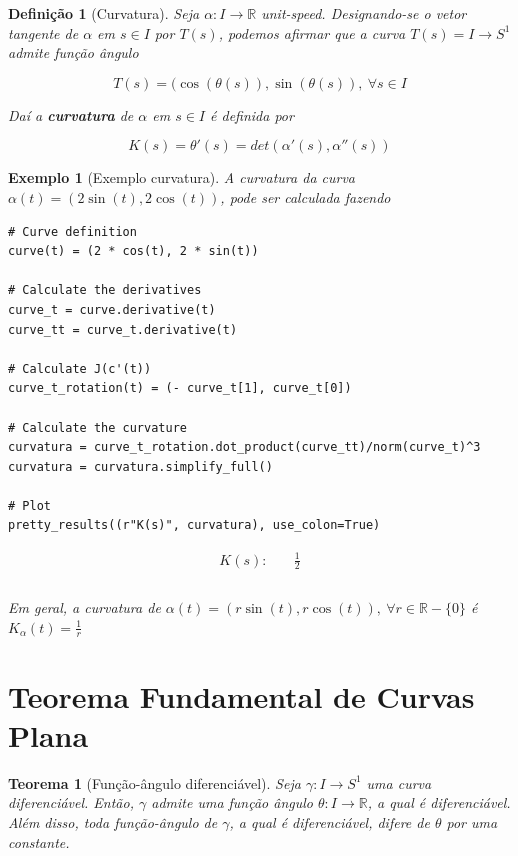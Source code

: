 \documentclass[12pt]{article}
\newtheorem{ex}{Exemplo}[section]
\newtheorem{theorem}{Teorema}
\newtheorem{definition}{Definição}
\begin{document}
\begin{definition}[Curvatura]
Seja $\alpha: I \rightarrow \mathbb{R}$ unit-speed. Designando-se o vetor tangente de $\alpha$ em $s \in I$ por $T(s)$, podemos afirmar que a curva $T(s) = I \rightarrow S^1$ admite função ângulo

$$T(s) = (\cos(\theta(s)), \sin(\theta(s)),\ \forall s \in I$$

Daí a \textbf{curvatura} de $\alpha$ em $s \in I$ é definida por

$$K(s) = \theta'(s) = det(\alpha'(s), \alpha''(s))$$
\end{definition}

\begin{ex}[Exemplo curvatura] A curvatura da curva $\alpha(t) = (2\sin(t), 2\cos(t))$, pode ser calculada fazendo
\begin{lstlisting}
# Curve definition
curve(t) = (2 * cos(t), 2 * sin(t))

# Calculate the derivatives
curve_t = curve.derivative(t)
curve_tt = curve_t.derivative(t)

# Calculate J(c'(t))
curve_t_rotation(t) = (- curve_t[1], curve_t[0])

# Calculate the curvature
curvatura = curve_t_rotation.dot_product(curve_tt)/norm(curve_t)^3
curvatura = curvatura.simplify_full()

# Plot
pretty_results((r"K(s)", curvatura), use_colon=True)
\end{lstlisting}

\newcommand{\Bold}[1]{\mathbf{#1}}\begin{align*} K(s) :& \quad \frac{1}{2} \\ \end{align*} \\

Em geral, a curvatura de $\alpha(t) = (r \sin(t), r \cos(t)),\ \forall r \in \mathbb{R} - \{0\}$ é $K_\alpha(t) = \frac{1}{r}$
\end{ex}

\section{Teorema Fundamental de Curvas Plana}\label{s4}
\begin{theorem}[Função-ângulo diferenciável]
Seja $\gamma: I \rightarrow S^1$ uma curva diferenciável. Então, $\gamma$ admite uma função ângulo $\theta: I \rightarrow \mathbb{R}$, a qual é diferenciável. Além disso, toda função-ângulo de $\gamma$, a qual é diferenciável, difere de $\theta$ por uma constante.
\end{theorem}
\end{document}
